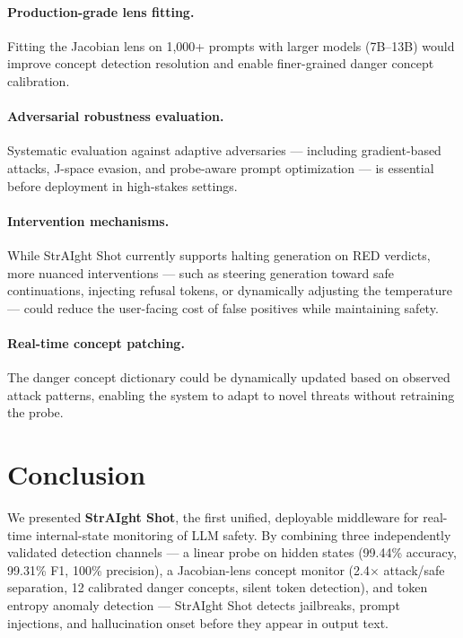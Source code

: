 \documentclass[11pt]{article}
\begin{document}
\paragraph{Production-grade lens fitting.}
Fitting the Jacobian lens on 1,000+ prompts with larger models (7B--13B) would improve concept detection resolution and enable finer-grained danger concept calibration.

\paragraph{Adversarial robustness evaluation.}
Systematic evaluation against adaptive adversaries — including gradient-based attacks, J-space evasion, and probe-aware prompt optimization — is essential before deployment in high-stakes settings.

\paragraph{Intervention mechanisms.}
While StrAIght Shot currently supports halting generation on RED verdicts, more nuanced interventions — such as steering generation toward safe continuations, injecting refusal tokens, or dynamically adjusting the temperature — could reduce the user-facing cost of false positives while maintaining safety.

\paragraph{Real-time concept patching.}
The danger concept dictionary could be dynamically updated based on observed attack patterns, enabling the system to adapt to novel threats without retraining the probe.

\section{Conclusion}
\label{sec:conclusion}

We presented \textbf{StrAIght Shot}, the first unified, deployable middleware for real-time internal-state monitoring of LLM safety. By combining three independently validated detection channels — a linear probe on hidden states (99.44\% accuracy, 99.31\% F1, 100\% precision), a Jacobian-lens concept monitor (2.4$\times$ attack/safe separation, 12 calibrated danger concepts, silent token detection), and token entropy anomaly detection — StrAIght Shot detects jailbreaks, prompt injections, and hallucination onset before they appear in output text.
\end{document}

